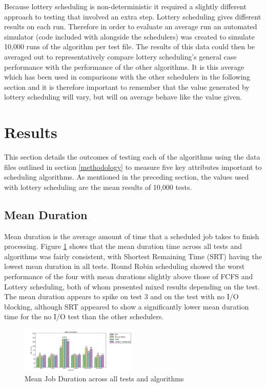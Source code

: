 \documentclass{acm_proc_article-sp}
\begin{document}
Because lottery scheduling is non-deterministic it required a slightly different approach to testing that involved an extra step. Lottery scheduling gives different results on each run. Therefore in order to evaluate an average run an automated simulator (code included with alongside the schedulers) was created to simulate 10,000 runs of the algorithm per test file. The results of this data could then be averaged out to representatively compare lottery scheduling's general case performance with the performance of the other algorithms. It is this average which has been used in comparisons with the other schedulers in the following section and it is therefore important to remember that the value generated by lottery scheduling will vary, but will on average behave like the value given.

\section{Results}
\label{results}
This section details the outcomes of testing each of the algorithms using the data files outlined in section \ref{methodology} to measure five key attributes important to scheduling algorithms. As mentioned in the preceding section, the values used with lottery scheduling are the mean results of 10,000 tests.

\subsection{Mean Duration}
\label{results-duration}
Mean duration is the average amount of time that a scheduled job takes to finish processing. Figure \ref{fig:duration} shows that the mean duration time across all tests and algorithms was fairly consistent, with Shortest Remaining Time (SRT) having the lowest mean duration in all tests. Round Robin scheduling showed the worst performance of the four with mean durations slightly above those of FCFS and Lottery scheduling, both of whom presented mixed results depending on the test. The mean duration appears to spike on test 3 and on the test with no I/O blocking, although SRT appeared to show a significantly lower mean duration time for the no I/O test than the other schedulers.


\begin{figure}[H]
\centering
\includegraphics[width=0.5\textwidth]{duration.png}
\caption{Mean Job Duration across all tests and algorithms}
\label{fig:duration}
\end{figure}
\end{document}
